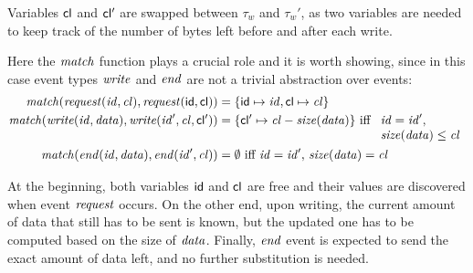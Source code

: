 Variables \(\mathsf{cl}\) and \(\mathsf{cl'}\) are swapped between \(\tau_w\) and \(\tau_w'\), as two variables are needed to keep track of the number of bytes left before and after each write.

Here the \(\mathit{match}\) function plays a crucial role and it is worth showing, since in this case event types $\mathit{write}$ and $\mathit{end}$ are not a trivial abstraction over events:
\begin{align*}
\mathit{match}(\mathit{request}(\mathit{id}, \mathit{cl}), \mathit{request}(\mathsf{id}, \mathsf{cl})) &= \{ \mathsf{id} \mapsto \mathit{id}, \mathsf{cl} \mapsto \mathit{cl} \}\\
\mathit{match}(\mathit{write}(\mathit{id}, \mathit{data}), \mathit{write}(\mathit{id}', \mathit{cl}, \mathsf{cl'})) &= \{ \mathsf{cl'} \mapsto \mathit{cl}-\mathit{size}(\mathit{data}) \} \mbox{ iff $\begin{array}[t]{l}\mathit{id}=\mathit{id}',\\ \mathit{size}(\mathit{data})\leq\mathit{cl}\end{array}$} \\
\mathit{match}(\mathit{end}(\mathit{id}, \mathit{data}), \mathit{end}(\mathit{id}', \mathit{cl})) &= \emptyset \mbox{ iff $\mathit{id}=\mathit{id}',\, \mathit{size}(\mathit{data})=\mathit{cl}$}
\end{align*}

At the beginning, both variables \(\mathsf{id}\) and \(\mathsf{cl}\) are free and their values are discovered when event \(\mathit{request}\) occurs.
On the other end, upon writing, the current amount of data that still has to be sent is known, but the updated one has to be computed based on the
size of $\mathit{data}$.
Finally, \(\mathit{end}\) event is expected to send the exact amount of data left, and no further substitution is needed.
